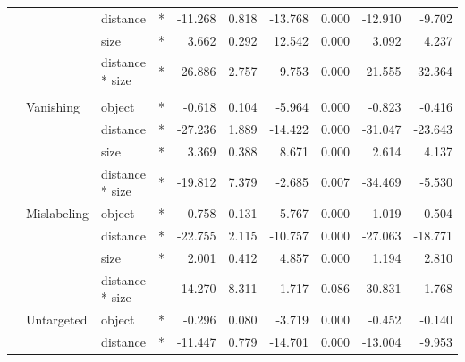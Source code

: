 \begin{longtable}[t]{llllrrrrrr}
\cmidrule{3-10}\nopagebreak
\hspace{1em} &  & distance & * & -11.268 & 0.818 & -13.768 & 0.000 & -12.910 & -9.702\\
\cmidrule{3-10}\nopagebreak
\hspace{1em} &  & size & * & 3.662 & 0.292 & 12.542 & 0.000 & 3.092 & 4.237\\
\cmidrule{3-10}\nopagebreak
\hspace{1em} &  & distance * size & * & 26.886 & 2.757 & 9.753 & 0.000 & 21.555 & 32.364\\
\cmidrule{1-10}\pagebreak[0]
\addlinespace[0.3em]
\multicolumn{10}{l}{\textbf{Faster R-CNN}}\\
\hspace{1em} & Vanishing & object & * & -0.618 & 0.104 & -5.964 & 0.000 & -0.823 & -0.416\\
\cmidrule{3-10}\nopagebreak
\hspace{1em} &  & distance & * & -27.236 & 1.889 & -14.422 & 0.000 & -31.047 & -23.643\\
\cmidrule{3-10}\nopagebreak
\hspace{1em} &  & size & * & 3.369 & 0.388 & 8.671 & 0.000 & 2.614 & 4.137\\
\cmidrule{3-10}\nopagebreak
\hspace{1em} &  & distance * size & * & -19.812 & 7.379 & -2.685 & 0.007 & -34.469 & -5.530\\
\cmidrule{2-10}\nopagebreak
\hspace{1em} & Mislabeling & object & * & -0.758 & 0.131 & -5.767 & 0.000 & -1.019 & -0.504\\
\cmidrule{3-10}\nopagebreak
\hspace{1em} &  & distance & * & -22.755 & 2.115 & -10.757 & 0.000 & -27.063 & -18.771\\
\cmidrule{3-10}\nopagebreak
\hspace{1em} &  & size & * & 2.001 & 0.412 & 4.857 & 0.000 & 1.194 & 2.810\\
\cmidrule{3-10}\nopagebreak
\hspace{1em} &  & distance * size &  & -14.270 & 8.311 & -1.717 & 0.086 & -30.831 & 1.768\\
\cmidrule{2-10}\nopagebreak
\hspace{1em} & Untargeted & object & * & -0.296 & 0.080 & -3.719 & 0.000 & -0.452 & -0.140\\
\cmidrule{3-10}\nopagebreak
\hspace{1em} &  & distance & * & -11.447 & 0.779 & -14.701 & 0.000 & -13.004 & -9.953\\

\end{longtable}
